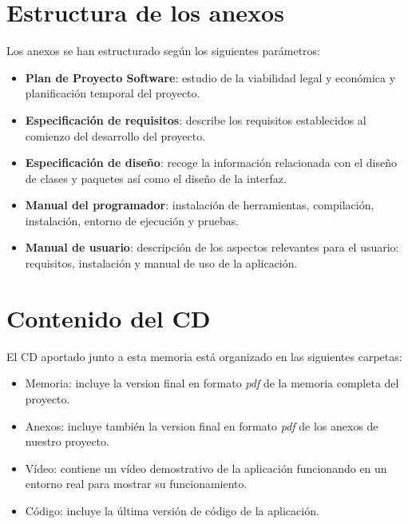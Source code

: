 \section{Estructura de los anexos}

Los anexos se han estructurado según los siguientes parámetros:


\begin{itemize}
\tightlist
\item
    \textbf{Plan de Proyecto Software}: estudio de la viabilidad legal y económica y planificación temporal del proyecto.
\item
    \textbf{Especificación de requisitos}: describe los requisitos establecidos al comienzo del desarrollo del proyecto.
\item
    \textbf{Especificación de diseño}: recoge la información relacionada con el diseño de clases y paquetes así como el diseño de la interfaz.
\item
    \textbf{Manual del programador}:  instalación de herramientas, compilación, instalación, entorno de ejecución y pruebas.
\item
    \textbf{Manual de usuario}: descripción de los aspectos relevantes para el usuario: requisitos, instalación y manual de uso de la aplicación.
\end{itemize}

\section{Contenido del CD}

El CD aportado junto a esta memoria está organizado en las siguientes carpetas:

\begin{itemize}
\item Memoria: incluye la version final en formato \textit{pdf} de la memoria completa del proyecto.
\item Anexos: incluye también la version final en formato \textit{pdf} de los anexos de nuestro proyecto.
\item Vídeo: contiene un vídeo demostrativo de la aplicación funcionando en un entorno real para mostrar su funcionamiento.
\item Código: incluye la última versión de código de la aplicación. \cite{wiki:codigoProyecto}
\end{itemize}